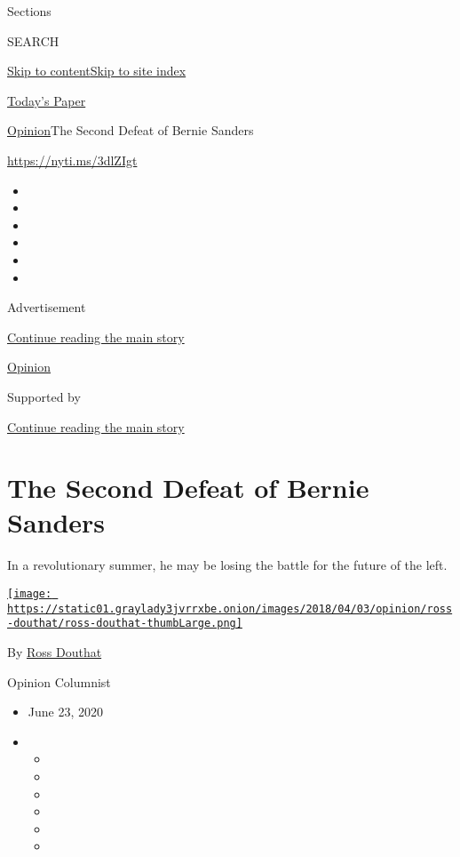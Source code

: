 Sections

SEARCH

\protect\hyperlink{site-content}{Skip to
content}\protect\hyperlink{site-index}{Skip to site index}

\href{https://myaccount.nytimes3xbfgragh.onion/auth/login?response_type=cookie\&client_id=vi}{}

\href{https://www.nytimes3xbfgragh.onion/section/todayspaper}{Today's
Paper}

\href{/section/opinion}{Opinion}\textbar{}The Second Defeat of Bernie
Sanders

\url{https://nyti.ms/3dlZIgt}

\begin{itemize}
\item
\item
\item
\item
\item
\item
\end{itemize}

Advertisement

\protect\hyperlink{after-top}{Continue reading the main story}

\href{/section/opinion}{Opinion}

Supported by

\protect\hyperlink{after-sponsor}{Continue reading the main story}

\hypertarget{the-second-defeat-of-bernie-sanders}{%
\section{The Second Defeat of Bernie
Sanders}\label{the-second-defeat-of-bernie-sanders}}

In a revolutionary summer, he may be losing the battle for the future of
the left.

\href{https://www.nytimes3xbfgragh.onion/by/ross-douthat}{\texttt{[image: https://static01.graylady3jvrrxbe.onion/images/2018/04/03/opinion/ross-douthat/ross-douthat-thumbLarge.png]}}

By \href{https://www.nytimes3xbfgragh.onion/by/ross-douthat}{Ross
Douthat}

Opinion Columnist

\begin{itemize}
\item
  June 23, 2020
\item
  \begin{itemize}
  \item
  \item
  \item
  \item
  \item
  \item
  \end{itemize}
\end{itemize}

